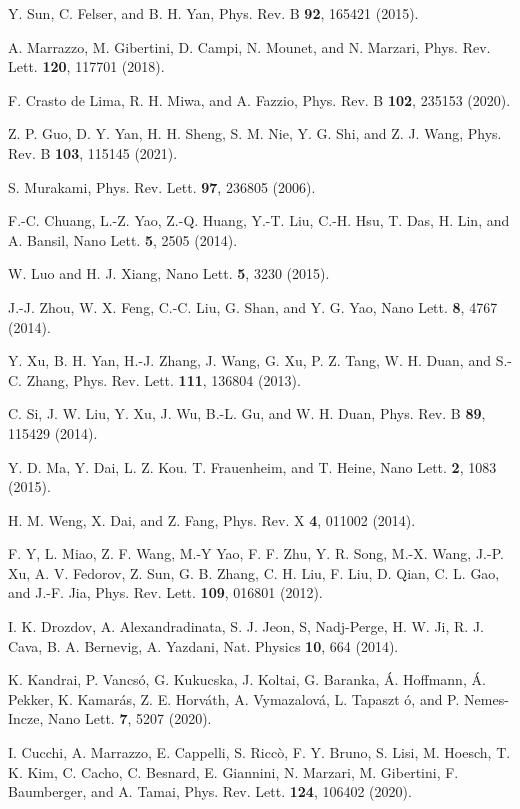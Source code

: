 \documentclass[aps,prl,twocolumn,showpacs,superscriptaddress]{revtex4-1}
\begin{document}
\begin{thebibliography}{99}
Y. Sun, C. Felser, and B. H. Yan, {Phys. Rev. B \textbf{92}, 165421 (2015)}.

A. Marrazzo, M. Gibertini, D. Campi, N. Mounet, and N. Marzari, {Phys. Rev. Lett. \textbf{120}, 117701 (2018)}.

F. Crasto de Lima, R. H. Miwa, and A. Fazzio, {Phys. Rev. B \textbf{102}, 235153 (2020)}.

Z. P. Guo, D. Y. Yan, H. H. Sheng, S. M. Nie, Y. G. Shi, and Z. J. Wang, {Phys. Rev. B \textbf{103}, 115145 (2021)}.

S. Murakami, {Phys. Rev. Lett. \textbf{97}, 236805 (2006)}.

F.-C. Chuang, L.-Z. Yao, Z.-Q. Huang, Y.-T. Liu, C.-H. Hsu, T. Das, H. Lin, and A. Bansil, {Nano Lett. \textbf{5}, 2505 (2014)}.

W. Luo and H. J. Xiang, {Nano Lett. \textbf{5}, 3230 (2015)}.

J.-J. Zhou, W. X. Feng, C.-C. Liu, G. Shan, and Y. G. Yao, {Nano Lett. \textbf{8}, 4767 (2014)}.

Y. Xu, B. H. Yan, H.-J. Zhang, J. Wang, G. Xu, P. Z. Tang, W. H. Duan, and S.-C. Zhang, {Phys. Rev. Lett. \textbf{111}, 136804 (2013)}.

C. Si, J. W. Liu, Y. Xu, J. Wu, B.-L. Gu, and W. H. Duan, {Phys. Rev. B \textbf{89}, 115429 (2014)}.

Y. D. Ma, Y. Dai, L. Z. Kou. T. Frauenheim, and T. Heine, {Nano Lett. \textbf{2}, 1083 (2015)}.

H. M. Weng, X. Dai, and Z. Fang, {Phys. Rev. X \textbf{4}, 011002 (2014)}.

F. Y, L. Miao, Z. F. Wang, M.-Y Yao, F. F. Zhu, Y. R. Song, M.-X. Wang, J.-P. Xu, A. V. Fedorov, Z. Sun, G. B. Zhang, C. H. Liu, F. Liu, D. Qian, C. L. Gao, and J.-F. Jia, {Phys. Rev. Lett. \textbf{109}, 016801 (2012)}.

I. K. Drozdov, A. Alexandradinata, S. J. Jeon, S, Nadj-Perge, H. W. Ji, R. J. Cava, B. A. Bernevig, A. Yazdani, {Nat. Physics \textbf{10}, 664 (2014)}.

K. Kandrai, P. Vancsó, G. Kukucska, J. Koltai, G. Baranka, Á. Hoffmann, Á. Pekker, K. Kamarás, Z. E. Horváth, A. Vymazalová, L. Tapaszt ó, and P. Nemes-Incze, {Nano Lett. \textbf{7}, 5207 (2020)}.

I. Cucchi, A. Marrazzo, E. Cappelli, S. Riccò, F. Y. Bruno, S. Lisi, M. Hoesch, T. K. Kim, C. Cacho, C. Besnard, E. Giannini, N. Marzari, M. Gibertini, F. Baumberger, and A. Tamai, {Phys. Rev. Lett. \textbf{124}, 106402 (2020)}.


\end{thebibliography}
\end{document}
